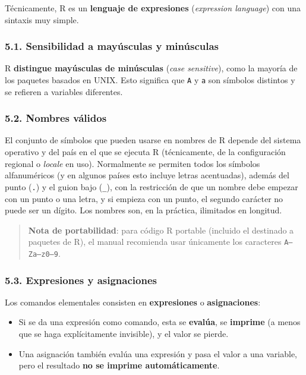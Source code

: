 \documentclass[
  jou,
  floatsintext,
  longtable,
  a4paper,
  nolmodern,
  notxfonts,
  notimes,
  12pt,
  colorlinks=true,linkcolor=blue,citecolor=blue,urlcolor=blue]{apa7}
\providecommand{\tightlist}{%
  \setlength{\itemsep}{0pt}\setlength{\parskip}{0pt}}
\begin{document}
Técnicamente, R es un \textbf{lenguaje de expresiones} (\emph{expression
language}) con una sintaxis muy simple.

\subsubsection{5.1. Sensibilidad a mayúsculas y
minúsculas}\label{sensibilidad-a-mayuxfasculas-y-minuxfasculas}

R \textbf{distingue mayúsculas de minúsculas} (\emph{case sensitive}),
como la mayoría de los paquetes basados en UNIX. Esto significa que
\texttt{A} y \texttt{a} son símbolos distintos y se refieren a variables
diferentes.

\subsubsection{5.2. Nombres válidos}\label{nombres-vuxe1lidos}

El conjunto de símbolos que pueden usarse en nombres de R depende del
sistema operativo y del país en el que se ejecuta R (técnicamente, de la
configuración regional o \emph{locale} en uso). Normalmente se permiten
todos los símbolos alfanuméricos (y en algunos países esto incluye
letras acentuadas), además del punto (\texttt{.}) y el guion bajo
(\texttt{\_}), con la restricción de que un nombre debe empezar con un
punto o una letra, y si empieza con un punto, el segundo carácter no
puede ser un dígito. Los nombres son, en la práctica, ilimitados en
longitud.

\begin{quote}
\textbf{Nota de portabilidad}: para código R portable (incluido el
destinado a paquetes de R), el manual recomienda usar únicamente los
caracteres \texttt{A–Za–z0–9}.
\end{quote}

\subsubsection{5.3. Expresiones y
asignaciones}\label{expresiones-y-asignaciones}

Los comandos elementales consisten en \textbf{expresiones} o
\textbf{asignaciones}:

\begin{itemize}
\tightlist
\item
  Si se da una expresión como comando, esta se \textbf{evalúa}, se
  \textbf{imprime} (a menos que se haga explícitamente invisible), y el
  valor se pierde.
\item
  Una asignación también evalúa una expresión y pasa el valor a una
  variable, pero el resultado \textbf{no se imprime automáticamente}.
\end{itemize}
\end{document}
